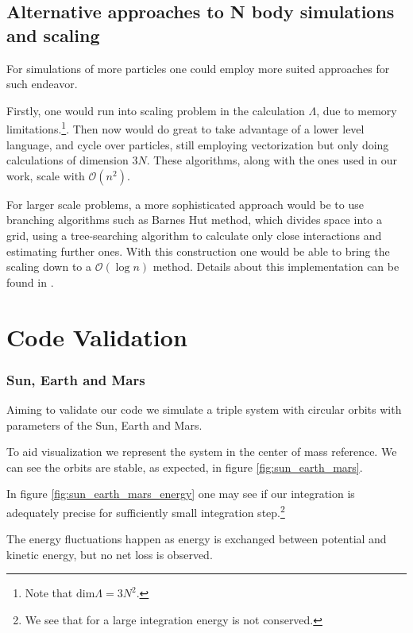 \documentclass{aa}
\begin{document}
\subsection{Alternative approaches to N body simulations and scaling}

For simulations of more particles one could employ more suited approaches for such
endeavor.

Firstly, one would run into scaling problem in the calculation $\Lambda$, due to
memory limitations.\footnote{Note that $\text{dim} \Lambda = 3N^2$.}. Then now
would do great to take advantage of a lower level language, and cycle over
particles, still employing vectorization but only doing calculations of
dimension $3N$. These algorithms, along with the ones used in our work, scale
with $\mathcal{O}(n^2)$.

For larger scale problems, a more sophisticated approach would be to use
branching algorithms such as Barnes Hut method, which divides space into a grid,
using a tree-searching algorithm to calculate only close interactions and
estimating further ones. With this construction one would be able to bring the
scaling down to a $\mathcal{O}(\log n)$ method. Details about this
implementation can be found in \cite{iwasawa_implementation_2019}.

\section{Code Validation}

\subsubsection{Sun, Earth and Mars}
\label{sec:sun_earth_mars}

Aiming to validate our code we simulate a triple system with circular orbits
with parameters of the Sun, Earth and Mars.

To aid visualization we represent the system in the center of mass reference. We
can see the orbits are stable, as expected, in figure \ref{fig:sun_earth_mars}.

In figure \ref{fig:sun_earth_mars_energy} one may see if our integration is
adequately precise for sufficiently small integration step.\footnote{We see
  that for a large integration energy is not conserved.}

The energy fluctuations happen as energy is exchanged between potential and
kinetic energy, but no net loss is observed.
\end{document}

